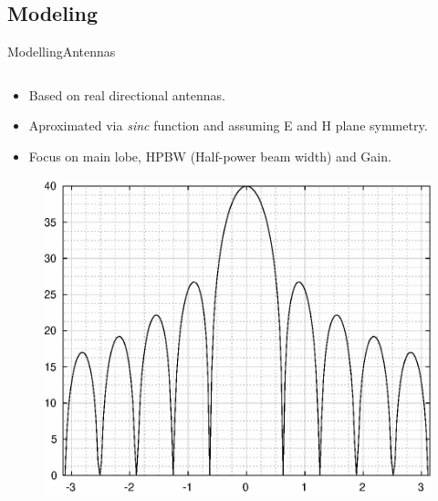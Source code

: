 \subsection{Modeling}

\begin{frame}{Modelling}{Antennas}
  \begin{columns}[T]
    \begin{column}{.5\textwidth}
      \begin{block}{}
        \begin{itemize}
          \item {Based on real directional antennas.}
          \item {Aproximated via \textit{sinc} function and assuming E and H plane symmetry.}
          \item {Focus on main lobe, HPBW (Half-power beam width) and Gain.}
        \end{itemize}
        \begin{figure}
        \includegraphics[scale=0.25]{figures/sinc2.eps}
      \end{figure}


\end{block}
\end{column}
\end{columns}
\end{frame}
